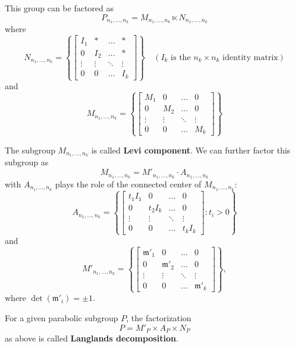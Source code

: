 This group can be factored as
\[P_{n_1,\ldots, n_k} =M_{n_1,\ldots, n_k}\ltimes N_{n_1,\ldots, n_k}\]
where
\[N_{n_1,\ldots, n_k} = \left\lbrace \begin{bmatrix}
        I_1    & \ast   & \ldots & \ast   \\
        0      & I_2    & \ldots & \ast   \\
        \vdots & \vdots & \ddots & \vdots \\
        0      & 0      & \ldots & I_k
    \end{bmatrix} \right\rbrace \quad \left(I_k \text{ is the $n_k\times n_k$ identity matrix}\right)\]
and
\[M_{n_1,\ldots, n_k} = \left\lbrace \begin{bmatrix}
        M_1    & 0      & \ldots & 0      \\
        0      & M_2    & \ldots & 0      \\
        \vdots & \vdots & \ddots & \vdots \\
        0      & 0      & \ldots & M_k
    \end{bmatrix} \right\rbrace\]

The subgroup $M_{n_1,\ldots, n_k}$ is called \textbf{Levi component}. We can further factor this subgroup as
\[M_{n_1,\ldots, n_k} = M'_{n_1,\ldots, n_k} \cdot A_{n_1,\ldots, n_k}\]
with $A_{n_1,\ldots, n_k}$ plays the role of the connected center of $M_{n_1,\ldots, n_k}$:
\[A_{n_1,\ldots, n_k} = \left\lbrace \begin{bmatrix}
        t_1I_1 & 0      & \ldots & 0      \\
        0      & t_2I_k & \ldots & 0      \\
        \vdots & \vdots & \ddots & \vdots \\
        0      & 0      & \ldots & t_kI_k
    \end{bmatrix} : t_i > 0\right\rbrace \]
and
\[M'_{n_1,\ldots, n_k} = \left\lbrace \begin{bmatrix}
        \mathfrak{m}'_1 & 0               & \ldots & 0               \\
        0               & \mathfrak{m}'_2 & \ldots & 0               \\
        \vdots          & \vdots          & \ddots & \vdots          \\
        0               & 0               & \ldots & \mathfrak{m}'_k
    \end{bmatrix} \right\rbrace,\]
where $\det(\mathfrak{m}'_i) = \pm 1$.
\begin{definition}
    For a given parabolic subgroup $P$, the factorization
    \[P = M'_P \times A_P \times N_P\]
    as above is called \textbf{Langlands decomposition}.
\end{definition}
